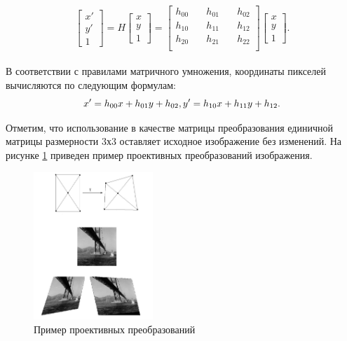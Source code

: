 {{	$$
	\begin{bmatrix}x'\\y'\\1\end{bmatrix} = 
	H\begin{bmatrix}x\\y\\1\end{bmatrix} = 
	\begin{bmatrix}
	h_{00} &\quad h_{01} &\quad h_{02} \\
	h_{10} &\quad h_{11} &\quad h_{12} \\
	h_{20} &\quad h_{21} &\quad h_{22} \\
	\end{bmatrix}
	\begin{bmatrix}x\\y\\1\end{bmatrix}.
	$$\\
	
	
	В соответствии с правилами матричного умножения, координаты пикселей вычисляются по следующим формулам:
	\begin{equation}\label{coordinates}
	x' = h_{00}x + h_{01}y + h_{02},\\
	y' = h_{10}x + h_{11}y + h_{12}.
	\end{equation}	
	
	Отметим, что использование в качестве матрицы преобразования единичной матрицы размерности 3х3 оставляет исходное изображение без изменений. На рисунке \ref{projectivе transform} приведен пример проективных преобразований изображения.
	
	\begin{figure}[H]
		\centering                             
		\includegraphics[width=0.4\textwidth,keepaspectratio]{transforms/projection.jpg}                 
		\centering\caption{ Пример проективных преобразований }
		\label{projectivе transform}                           
	\end{figure}    

}}
